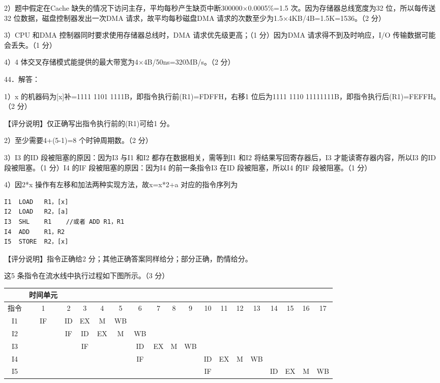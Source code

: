 \documentclass[UTF8,11pt]{ctexart}
\begin{document}
2）题中假定在Cache 缺失的情况下访问主存，平均每秒产生缺页中断300000×0.0005\%=1.5 次。因为存储器总线宽度为32 位，所以每传送32 位数据，磁盘控制器发出一次DMA 请求，故平均每秒磁盘DMA 请求的次数至少为1.5×4KB/4B=1.5K=1536。（2 分）


3）CPU 和DMA 控制器同时要求使用存储器总线时，DMA 请求优先级更高；（1 分）因为DMA 请求得不到及时响应，I/O 传输数据可能会丢失。（1 分）


4）4 体交叉存储模式能提供的最大带宽为4×4B/50ns=320MB/s。（2 分）


44．解答：


1）x 的机器码为[x]补=1111 1101 1111B，即指令执行前(R1)=FDFFH，右移1 位后为1111 1110 11111111B，即指令执行后(R1)=FEFFH。（2 分）


【评分说明】仅正确写出指令执行前的(R1)可给1 分。


2）至少需要4+(5-1)=8 个时钟周期数。（2 分）


3）I3 的ID 段被阻塞的原因：因为I3 与I1 和I2 都存在数据相关，需等到I1 和I2 将结果写回寄存器后，I3 才能读寄存器内容，所以I3 的ID 段被阻塞。（1 分）I4 的IF 段被阻塞的原因：因为I4 的前一条指令I3 在ID 段被阻塞，所以I4 的IF 段被阻塞。（1 分）


4）因2*x 操作有左移和加法两种实现方法，故x=x*2+a 对应的指令序列为


\begin{Verbatim}[breaklines,breakanywhere,fontsize=\small]
I1  LOAD   R1，[x]
I2  LOAD   R2，[a]
I3  SHL    R1    //或者 ADD R1，R1
I4  ADD    R1，R2
I5  STORE  R2，[x]
\end{Verbatim}

【评分说明】指令正确给2 分；其他正确答案同样给分；部分正确，酌情给分。


这5 条指令在流水线中执行过程如下图所示。（3 分）


\begin{center}\begin{adjustbox}{max width=\linewidth}\begin{tabular}{|c|c|c|c|c|c|c|c|c|c|c|c|c|c|c|c|c|c|}\hline
 & 时间单元 &  &  &  &  &  &  &  &  &  &  &  &  &  &  &  & \\\hline
指令 & 1 & 2 & 3 & 4 & 5 & 6 & 7 & 8 & 9 & 10 & 11 & 12 & 13 & 14 & 15 & 16 & 17\\\hline
I1 & IF & ID & EX & M & WB &  &  &  &  &  &  &  &  &  &  &  & \\\hline
I2 &  & IF & ID & EX & M & WB &  &  &  &  &  &  &  &  &  &  & \\\hline
I3 &  &  & IF &  &  & ID & EX & M & WB &  &  &  &  &  &  &  & \\\hline
I4 &  &  &  &  &  & IF &  &  &  & ID & EX & M & WB &  &  &  & \\\hline
I5 &  &  &  &  &  &  &  &  &  & IF &  &  &  & ID & EX & M & WB\\\hline\end{tabular}\end{adjustbox}\end{center}
\end{document}
